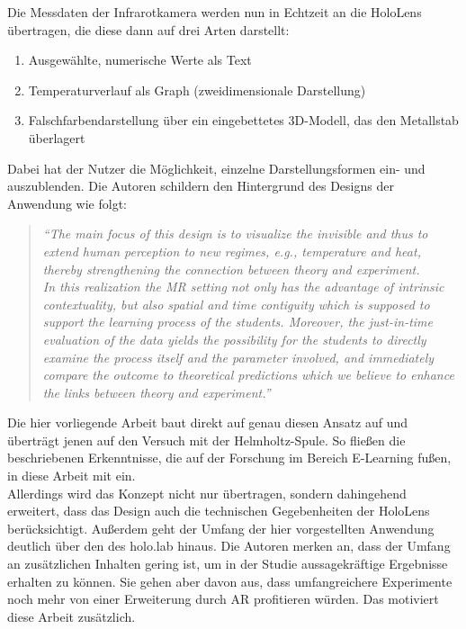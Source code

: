 Die Messdaten der Infrarotkamera werden nun in Echtzeit an die HoloLens übertragen, die diese dann auf drei Arten darstellt:
\begin{enumerate}
	\setlength{\itemsep}{-2pt}
	\item Ausgewählte, numerische Werte als Text
	\item Temperaturverlauf als Graph (zweidimensionale Darstellung)
	\item Falschfarbendarstellung über ein eingebettetes 3D-Modell, das den Metallstab überlagert
\end{enumerate}
Dabei hat der Nutzer die Möglichkeit, einzelne Darstellungsformen ein- und auszublenden. Die Autoren schildern den Hintergrund des Designs der Anwendung wie folgt:
\begin{quote}
	\textit{``The main focus of this design is to visualize the invisible and thus to extend human perception to new regimes, e.g., temperature and heat, thereby strengthening the connection between theory and experiment.\\ 
	In this realization the MR setting not only has the advantage of intrinsic contextuality, but also spatial and time contiguity which is supposed to support the learning process of the students. Moreover, the just-in-time evaluation of the data yields the possibility for the students to directly examine the process itself and the parameter involved, and immediately compare the outcome to theoretical predictions which we believe to enhance the links between theory and experiment.''}
\end{quote}

Die hier vorliegende Arbeit baut direkt auf genau diesen Ansatz auf und überträgt jenen auf den Versuch mit der Helmholtz-Spule. So fließen die beschriebenen Erkenntnisse, die auf der Forschung im Bereich E-Learning fußen, in diese Arbeit mit ein.\\

Allerdings wird das Konzept nicht nur übertragen, sondern dahingehend erweitert, dass das Design auch die technischen Gegebenheiten der HoloLens berücksichtigt. Außerdem geht der Umfang der hier vorgestellten Anwendung deutlich über den des holo.lab hinaus. Die Autoren merken an, dass der Umfang an zusätzlichen Inhalten gering ist, um in der Studie aussagekräftige Ergebnisse erhalten zu können. Sie gehen aber davon aus, dass umfangreichere Experimente noch mehr von einer Erweiterung durch AR profitieren würden. Das motiviert diese Arbeit zusätzlich.

